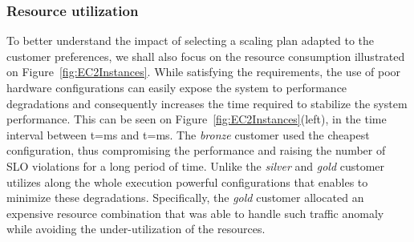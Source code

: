 \subsubsection{Resource utilization} 
To better understand the impact of selecting a scaling plan adapted to the customer preferences, we shall also focus on the resource consumption illustrated on Figure~\ref{fig:EC2Instances}. While satisfying the requirements, the use of poor hardware configurations can easily expose the system to performance degradations and consequently increases the time required to stabilize the system performance. This can be seen on  Figure~\ref{fig:EC2Instances}(left), in the time interval between t=ms and t=ms. The \emph{bronze} customer used the cheapest configuration, thus compromising the performance and raising the number of SLO violations for a long period of time. Unlike the \emph{silver} and \emph{gold} customer utilizes along the whole execution powerful configurations that enables to minimize these degradations. Specifically, the \emph{gold} customer allocated an expensive resource combination that was able to handle such traffic anomaly while avoiding the under-utilization of the resources. 



